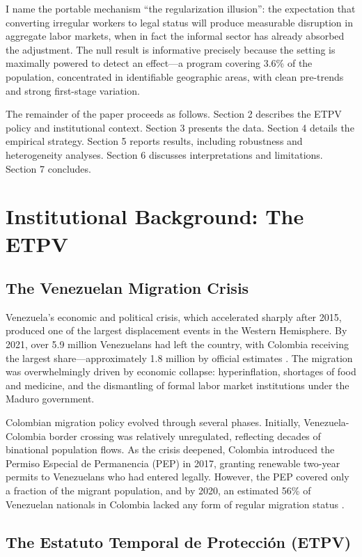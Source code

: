 \documentclass[12pt]{article}
\begin{document}
I name the portable mechanism ``the regularization illusion'': the expectation that converting irregular workers to legal status will produce measurable disruption in aggregate labor markets, when in fact the informal sector has already absorbed the adjustment. The null result is informative precisely because the setting is maximally powered to detect an effect---a program covering 3.6\% of the population, concentrated in identifiable geographic areas, with clean pre-trends and strong first-stage variation.

The remainder of the paper proceeds as follows. Section 2 describes the ETPV policy and institutional context. Section 3 presents the data. Section 4 details the empirical strategy. Section 5 reports results, including robustness and heterogeneity analyses. Section 6 discusses interpretations and limitations. Section 7 concludes.


\section{Institutional Background: The ETPV}

\subsection{The Venezuelan Migration Crisis}

Venezuela's economic and political crisis, which accelerated sharply after 2015, produced one of the largest displacement events in the Western Hemisphere. By 2021, over 5.9 million Venezuelans had left the country, with Colombia receiving the largest share---approximately 1.8 million by official estimates \citep{r4v2021}. The migration was overwhelmingly driven by economic collapse: hyperinflation, shortages of food and medicine, and the dismantling of formal labor market institutions under the Maduro government.

Colombian migration policy evolved through several phases. Initially, Venezuela-Colombia border crossing was relatively unregulated, reflecting decades of binational population flows. As the crisis deepened, Colombia introduced the Permiso Especial de Permanencia (PEP) in 2017, granting renewable two-year permits to Venezuelans who had entered legally. However, the PEP covered only a fraction of the migrant population, and by 2020, an estimated 56\% of Venezuelan nationals in Colombia lacked any form of regular migration status \citep{worldbank2021}.

\subsection{The Estatuto Temporal de Protecci\'on (ETPV)}
\end{document}
